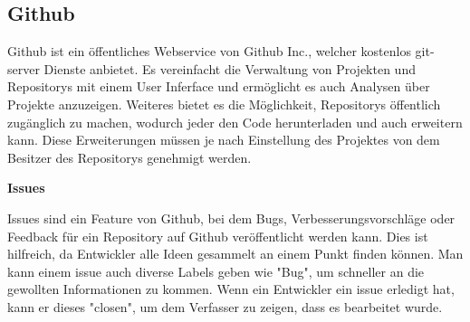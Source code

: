 \renewcommand{\kapitelautor}{Autor: Felix Zwickelstorfer}
\subsection{Github}\label{subsec:github}


Github ist ein öffentliches Webservice von Github Inc., welcher kostenlos git-server Dienste anbietet.
Es vereinfacht die Verwaltung von Projekten und Repositorys mit einem User Inferface und ermöglicht es auch Analysen über Projekte anzuzeigen.
Weiteres bietet es die Möglichkeit, Repositorys öffentlich zugänglich zu machen, wodurch jeder den Code herunterladen und auch erweitern kann.
Diese Erweiterungen müssen je nach Einstellung des Projektes von dem Besitzer des Repositorys genehmigt werden.

\renewcommand{\kapitelautor}{Autor: Felix Zwickelstorfer}
\textbf{Issues}

Issues sind ein Feature von Github, bei dem Bugs, Verbesserungsvorschläge oder Feedback für ein Repository auf Github veröffentlicht werden kann.
Dies ist hilfreich, da Entwickler alle Ideen gesammelt an einem Punkt finden können.
Man kann einem issue auch diverse Labels geben wie \zB "Bug", um schneller an die gewollten Informationen zu kommen.
Wenn ein Entwickler ein issue erledigt hat, kann er dieses "closen", um dem Verfasser zu zeigen, dass es bearbeitet wurde.